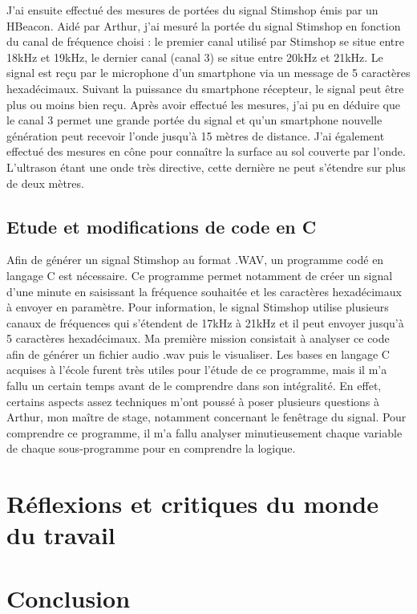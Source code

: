 \documentclass[12pt]{report}
\begin{document}
J'ai ensuite effectué des mesures de portées du signal Stimshop émis par un HBeacon. Aidé par Arthur, j'ai mesuré la portée du signal Stimshop en fonction du canal de fréquence choisi : le premier canal utilisé par Stimshop se situe entre 18kHz et 19kHz, le dernier canal (canal 3) se situe entre 20kHz et 21kHz. Le signal est reçu par le microphone d'un smartphone via un message de 5 caractères hexadécimaux. Suivant la puissance du smartphone récepteur, le signal peut être plus ou moins bien reçu. Après avoir effectué les mesures, j'ai pu en déduire que le canal 3 permet une grande portée du signal et qu'un smartphone nouvelle génération peut recevoir l'onde jusqu'à 15 mètres de distance. J'ai également effectué des mesures en cône pour connaître la surface au sol couverte par l'onde. L'ultrason étant une onde très directive, cette dernière ne peut s'étendre sur plus de deux mètres. 

	\section{Etude et modifications de code en C} 

Afin de générer un signal Stimshop au format .WAV, un programme codé en langage C est nécessaire. Ce programme permet notamment de créer un signal d'une minute en saisissant la fréquence souhaitée et les caractères hexadécimaux à envoyer en paramètre. Pour information, le signal Stimshop utilise plusieurs canaux de fréquences qui s'étendent de 17kHz à 21kHz et il peut envoyer jusqu'à 5 caractères hexadécimaux.  
Ma première mission consistait à analyser ce code afin de générer un fichier audio .wav puis le visualiser. Les bases en langage C acquises à l'école furent très utiles pour l'étude de ce programme, mais il m'a fallu un certain temps avant de le comprendre dans son intégralité. En effet, certains aspects assez techniques m'ont poussé à poser plusieurs questions à Arthur, mon maître de stage, notamment concernant le fenêtrage du signal. Pour comprendre ce programme, il m'a fallu analyser minutieusement chaque variable de chaque sous-programme pour en comprendre la logique. 

\chapter{Réflexions et critiques du monde du travail}



\chapter*{Conclusion}


\end{document}
